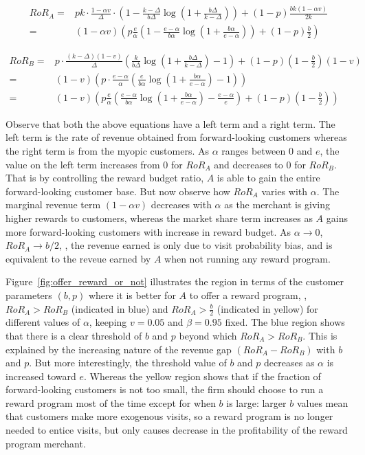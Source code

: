 \begin{align*}
RoR_A =& pk\cdot\frac{1-\alpha v}{\Delta}\cdot\left(1 - \frac{k-\Delta}{b\Delta}\log\left(1+\frac{b\Delta}{k-\Delta}\right)\right) + (1-p)\frac{bk(1-\alpha v)}{2k}\\
      =& (1-\alpha v) \left(p\frac{e}{\alpha}\left(1-\frac{e-\alpha}{b\alpha}\log\left(1+\frac{b\alpha}{e-\alpha}\right)\right) + (1-p)\frac{b}{2}\right)
\end{align*}

\begin{align*}
RoR_B =& p\cdot\frac{(k-\Delta)(1-v)}{\Delta}\left(\frac{k}{b\Delta}\log\left(1+\frac{b\Delta}{k-\Delta}\right) - 1\right) + (1-p)(1-\frac{b}{2})(1-v)\\
      =& (1-v)\left(p\cdot\frac{e-\alpha}{\alpha}\left(\frac{e}{b\alpha}\log\left(1+\frac{b\alpha}{e-\alpha}\right) - 1\right)\right)\\
      =& (1-v)\left(p\frac{e}{\alpha}\left(\frac{e-\alpha}{b\alpha}\log\left(1+\frac{b\alpha}{e-\alpha}\right) - \frac{e-\alpha}{e}\right) + (1-p)(1-\frac{b}{2})\right)
\end{align*}

Observe that both the above equations have a left term and a right term. The left term is the rate of revenue obtained from forward-looking customers whereas the right term is from the myopic customers.
As $\alpha$ ranges between $0$ and $e$, the value on the left term increases from $0$ for $RoR_A$ and decreases to $0$ for $RoR_B$.
That is by controlling the reward budget ratio, $A$ is able to gain the entire forward-looking customer base.
But now observe how $RoR_A$ varies with $\alpha$.
The marginal revenue term $(1-\alpha v)$ decreases with $\alpha$ as the merchant is giving higher rewards to customers, whereas the market share term increases as $A$ gains more forward-looking customers with increase in reward budget.
As $\alpha \to 0$, $RoR_A \to b/2$, \ie, the revenue earned is only due to visit probability bias, and is equivalent to the reveue earned by $A$ when not running any reward program.

Figure~\ref{fig:offer_reward_or_not} illustrates the region in terms of the customer parameters $(b,p)$ where it is better for $A$ to offer a reward program, \ie, $RoR_A > RoR_B$ (indicated in blue) and $RoR_A > \frac{b}{2}$ (indicated in yellow) for different values of $\alpha$, keeping $v = 0.05$ and $\beta = 0.95$ fixed.
The blue region shows that there is a clear threshold of $b$ and $p$ beyond which $RoR_A > RoR_B$.
This is explained by the increasing nature of the revenue gap $(RoR_A - RoR_B)$ with $b$ and $p$.
But more interestingly, the threshold value of $b$ and $p$ decreases as $\alpha$ is increased toward $e$.
Whereas the yellow region shows that if the fraction of forward-looking customers is not too small, the firm should choose to run a reward program most of the time except for when $b$ is large: larger $b$ values mean that customers make more exogenous visits, so a reward program is no longer needed to entice visits, but only causes decrease in the profitability of the reward program merchant.

